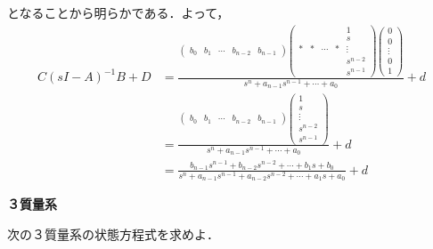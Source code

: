 \documentclass[a4paper,11pt]{jreport}
\begin{document}
となることから明らかである．よって，
\begin{align}
 C(sI-A)^{-1}B + D
 &=
 \frac{
    \left(\begin{array}{ccccc}
        b_0 & b_1 & \cdots & b_{n-2} & b_{n-1}
    \end{array}\right)
    \left(\begin{array}{ccccc}
        &    &        &    &  1 \\
	    &    &        &    &  s \\
	  * &  * & \cdots &  * &  \vdots \\
	    &    &        &    &  s^{n-2} \\
	    &    &        &    &  s^{n-1}
	\end{array}\right)
    \left(\begin{array}{c}
         0 \\
	 0 \\
	 \vdots \\
	 0 \\
	 1
	\end{array}\right)
 }
 {s^n + a_{n-1} s^{n-1}  + \cdots + a_0}
    + d
\nonumber\\[1cm]
 &=
 \frac{
    \left(\begin{array}{ccccc}
        b_0 & b_1 & \cdots & b_{n-2} & b_{n-1}
    \end{array}\right)
    \left(\begin{array}{c}
     1 \\
	 s \\
	 \vdots \\
	 s^{n-2} \\
	 s^{n-1}
	\end{array}\right)
 }
 {s^n + a_{n-1} s^{n-1}  + \cdots + a_0}
    + d
\nonumber \\[1cm]
 &=
   \frac{b_{n-1} s^{n-1} + b_{n-2} s^{n-2} + \cdots + b_1 s + b_0}
  {s^n + a_{n-1} s^{n-1} + a_{n-2} s^{n-2} + \cdots + a_1 s + a_0}
  + d
\nonumber
\end{align}


\newpage

\noindent
{\bf ３質量系}

次の３質量系の状態方程式を求めよ．
\begin{figure}[htbp]
 \begin{center}
 \end{center}
\end{figure}

\newpage
\end{document}
